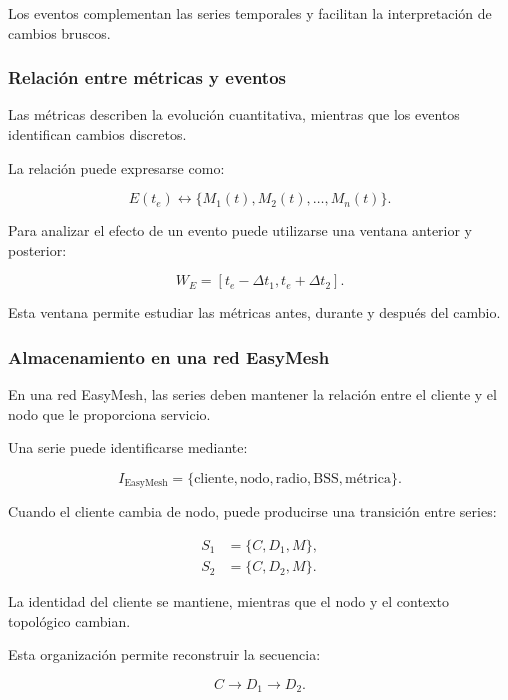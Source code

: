 Los eventos complementan las series temporales y facilitan la
interpretación de cambios bruscos.


\subsubsection*{Relación entre métricas y eventos}

Las métricas describen la evolución cuantitativa, mientras que los
eventos identifican cambios discretos.

La relación puede expresarse como:

\[
    E(t_e)
    \longleftrightarrow
    \{
        M_1(t),
        M_2(t),
        \ldots,
        M_n(t)
    \}.
\]

Para analizar el efecto de un evento puede utilizarse una ventana
anterior y posterior:

\[
    W_E
    =
    [
        t_e-\Delta t_1,
        t_e+\Delta t_2
    ].
\]

Esta ventana permite estudiar las métricas antes, durante y después del
cambio.


\subsubsection*{Almacenamiento en una red EasyMesh}

En una red EasyMesh, las series deben mantener la relación entre el
cliente y el nodo que le proporciona servicio.

Una serie puede identificarse mediante:

\[
    I_{\mathrm{EasyMesh}}
    =
    \{
        \text{cliente},
        \text{nodo},
        \text{radio},
        \text{BSS},
        \text{métrica}
    \}.
\]

Cuando el cliente cambia de nodo, puede producirse una transición entre
series:

\[
\begin{aligned}
    S_1
    &=
    \{
        C,
        D_1,
        M
    \},\\
    S_2
    &=
    \{
        C,
        D_2,
        M
    \}.
\end{aligned}
\]

La identidad del cliente se mantiene, mientras que el nodo y el contexto
topológico cambian.

Esta organización permite reconstruir la secuencia:

\[
    C
    \longrightarrow
    D_1
    \longrightarrow
    D_2.
\]

